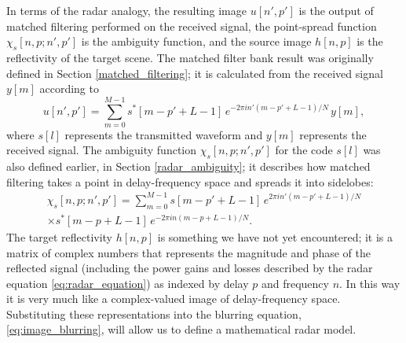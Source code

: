 In terms of the radar analogy, the resulting image $u[n',p']$ is the output of matched filtering performed on the received signal, the point-spread function $\chi_s[n,p;n',p']$ is the ambiguity function, and the source image $h[n,p]$ is the reflectivity of the target scene. The matched filter bank result was originally defined in Section \ref{matched_filtering}; it is calculated from the received signal $y[m]$ according to
\begin{equation}\label{eq:matched_filtering_for_model}
 u[n',p'] = \sum_{m=0}^{M-1} s^*[m - p' + L-1]\, e^{-2\pi i n' (m-p'+L-1)/N}\, y[m],
\end{equation}
where $s[l]$ represents the transmitted waveform and $y[m]$ represents the received signal. The ambiguity function $\chi_s[n,p;n',p']$ for the code $s[l]$ was also defined earlier, in Section \ref{radar_ambiguity}; it describes how matched filtering takes a point in delay-frequency space and spreads it into sidelobes:
\begin{multline}
 \chi_s[n,p;n',p'] = \sum_{m=0}^{M-1} s[m - p' + L - 1]\, e^{2\pi i n' (m-p'+L-1)/N}\\
 \times s^*[m - p + L - 1]\, e^{-2\pi i n (m-p+L-1)/N}.
\end{multline}
The target reflectivity $h[n,p]$ is something we have not yet encountered; it is a matrix of complex numbers that represents the magnitude and phase of the reflected signal (including the power gains and losses described by the radar equation \eqref{eq:radar_equation}) as indexed by delay $p$ and frequency $n$. In this way it is very much like a complex-valued image of delay-frequency space. Substituting these representations into the blurring equation, \eqref{eq:image_blurring}, will allow us to define a mathematical radar model.

